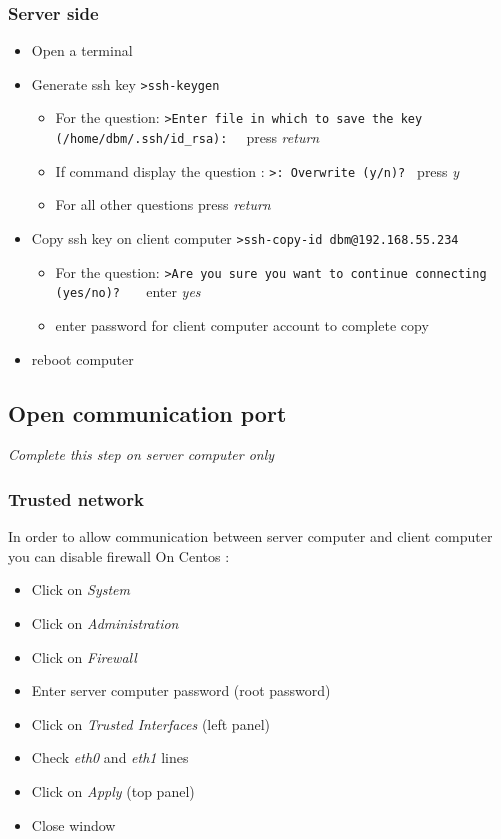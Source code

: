 \subsubsection{Server side}
\begin{itemize}
\item Open a terminal
\item Generate ssh key
	\newline
	\verb|>ssh-keygen |
	\begin{itemize}
	\item For the question:
		\newline
		\verb|>Enter file in which to save the key (/home/dbm/.ssh/id_rsa):  |
		\newline
		press \emph{return}
	\item If command display the question : 
		\newline
		\verb|>: Overwrite (y/n)? |
		\newline
		press \emph{y}
	\item For all other questions press \emph{return}
	\end{itemize}
\item Copy ssh key on client computer
	\newline
	\verb|>ssh-copy-id dbm@192.168.55.234|		
	\begin{itemize}
	\item For the question:
		\newline
		\verb|>Are you sure you want to continue connecting (yes/no)?   |
		\newline
		enter \emph{yes}	
	\item enter password for client computer account to complete copy
	\end{itemize}
\item reboot computer
\end{itemize}

\subsection{Open communication port}
\emph{Complete this step on server computer only}
\label{trusted-network}
\subsubsection{Trusted network}
In order to allow communication between server computer and client computer you can disable firewall
On Centos : 
\begin{itemize}
\item Click on \emph{System}
\item Click on \emph{Administration}
\item Click on \emph{Firewall}
\item Enter server computer password (root password)
\item Click on \emph{Trusted Interfaces} (left panel)
\item Check \emph{eth0} and \emph{eth1} lines
\item Click on \emph{Apply} (top panel)
\item Close window
\end{itemize}

